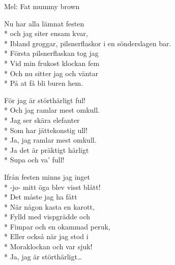 \begin{SongText}
    \begin{SongInfo}
        Mel: Fat mummy brown
    \end{SongInfo}
    \begin{SongVerse}
        Nu har alla lämnat festen\\*%
        och jag siter ensam kvar,\\*%
        Ibland groggar, pilsnerflaskor i en sönderslagen bar.\\*%
        Första pilsnerflaskan tog jag\\*%
        Vid min frukost klockan fem\\*%
        Och nu sitter jag och väntar\\*%
        På at få bli buren hem.
    \end{SongVerse}
    \begin{SongVerse}
        För jag är störthärligt ful!\\*%
        Och jag ramlar mest omkull.\\*%
        Jag ser skära elefanter\\*%
        Som har jättekonstig ull!\\*%
        Ja, jag ramlar mest omkull.\\*%
        Ja det är präktigt härligt\\*%
        Supa och va’ full!
    \end{SongVerse}
    \begin{SongVerse}
        Ifrån festen minns jag inget\\*%
        -jo- mitt öga blev visst blått!\\*%
        Det måste jag ha fått\\*%
        När någon kasta en karott,\\*%
        Fylld med vispgrädde och\\*%
        Fimpar och en okammad peruk,\\*%
        Eller också när jag stod i\\*%
        Moraklockan och var sjuk!\\*%
        Ja, jag är störthärligt…
    \end{SongVerse}
\end{SongText}
